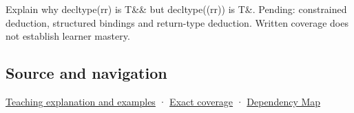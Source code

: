 Explain why decltype(rr) is T\&\& but decltype((rr)) is T\&. Pending: constrained deduction, structured bindings and return-type deduction. Written coverage does not establish learner mastery.

\subsection{Source and navigation}\label{appendix-5d4252a42886-source-and-navigation}

\hyperref[01-foundations-i-ch003-an-expression-has-a-type-and-a-category]{Teaching explanation and examples} · \hyperref[appendix-fd090d982a15-m008---parts-113-126]{Exact coverage} · \hyperref[appendix-4ad47bdd269a]{Dependency Map}
